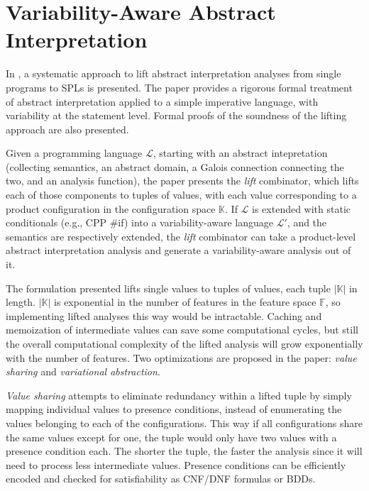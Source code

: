 \documentclass[11pt]{article}
\begin{document}
\section{Variability-Aware Abstract Interpretation}

\newcommand{\configSpace}{\mathbb{K}}
\newcommand{\featSpace}{\mathbb{F}}
\newcommand{\lang}{\mathcal{L}}

In \cite{Midtgaard:2015}, a systematic approach to lift abstract interpretation analyses from single programs to SPLs is presented. The paper provides a rigorous  formal treatment of abstract interpretation applied to a simple imperative language, with variability at the statement level. Formal proofs of the soundness of the lifting approach are also presented. 

Given a programming language $\lang$, starting with an abstract intepretation (collecting semantics, an abstract domain, a Galois connection connecting the two, and an analysis function), the paper presents the \emph{lift} combinator, which lifts each of those components to tuples of values, with each value corresponding to a product configuration in the configuration space $\configSpace$. If $\lang$ is extended with static conditionals (e.g., CPP \#if) into a variability-aware language  $\lang'$, and the semantics are respectively extended, the \emph{lift} combinator can take a product-level abstract interpretation analysis and generate a variability-aware analysis out of it. 

The formulation presented lifts single values to tuples of values, each tuple $|\configSpace|$ in length. $|\configSpace|$ is exponential in the number of features in the feature space $\featSpace$, so implementing lifted analyses this way would be intractable. Caching and memoization of intermediate values can save some computational cycles, but still the overall computational complexity of the lifted analysis will grow exponentially with the number of features. Two optimizations are proposed in the paper: \emph{value sharing} and \emph{variational abstraction}.

\emph{Value sharing} attempts to eliminate redundancy within a lifted tuple by simply mapping individual values to presence conditions, instead of enumerating the values belonging to each of the configurations. This way if all configurations share the same values except for one, the tuple would only have two values with a presence condition each. The shorter the tuple, the faster the analysis since it will need to process less intermediate values. Presence conditions can be efficiently encoded and checked for satisfiability as CNF/DNF formulas or BDDs.
\end{document}
